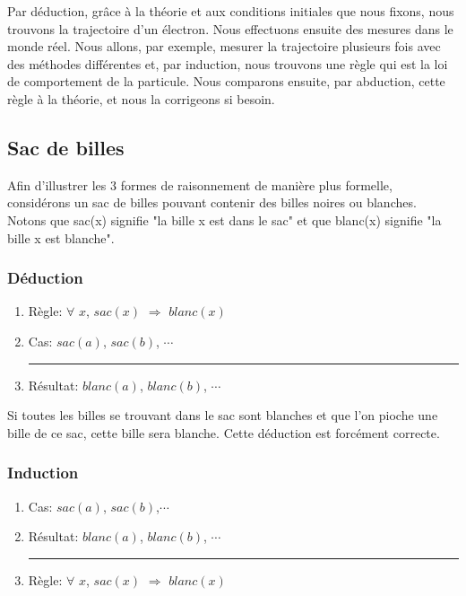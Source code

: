 Par déduction, grâce à la théorie et aux conditions initiales que nous fixons, nous trouvons la trajectoire d'un électron. Nous effectuons ensuite des mesures dans le monde réel. Nous allons, par exemple, mesurer la trajectoire plusieurs fois avec des méthodes différentes et, par induction, nous trouvons une règle qui est la loi de comportement de la particule. Nous comparons ensuite, par abduction, cette règle à la théorie, et nous la corrigeons si besoin.\\



\subsection{Sac de billes}

Afin d'illustrer les 3 formes de raisonnement de manière plus formelle, considérons un sac de billes pouvant contenir des billes noires ou blanches. Notons que sac(x) signifie "la bille x est dans le sac" et que blanc(x) signifie "la bille x est blanche". \\

\subsubsection{Déduction}

\begin{enumerate}
  \item Règle: $\forall$ $x$, $sac(x)$ $\Rightarrow$ $blanc(x)$
  \item Cas: $sac(a)$, $sac(b)$, $\cdots$\\
  \rule{5.5cm}{.1pt} 
  \item Résultat: $blanc(a)$, $blanc(b)$, $\cdots$
\end{enumerate}

Si toutes les billes se trouvant dans le sac sont blanches et que l'on pioche une bille de ce sac, cette bille sera blanche. Cette déduction est forcément correcte.

\subsubsection{Induction}

\begin{enumerate}
  \item Cas: $sac(a)$, $sac(b)$,$\cdots$
  \item Résultat: $blanc(a)$, $blanc(b)$, $\cdots$\\
  \rule{5.5cm}{.1pt}	
  \item Règle: $\forall$ $x$, $sac(x)$ $\Rightarrow$ $blanc(x)$
\end{enumerate}

